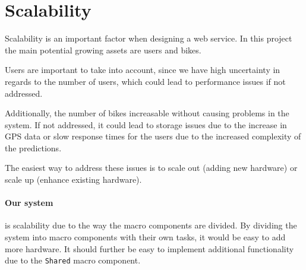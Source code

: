 \section{Scalability}
Scalability is an important factor when designing a web service. In this project the main  potential growing assets are users and bikes.

Users are important to take into account, since we have high uncertainty in regards to the number of users, which could lead to performance issues if not addressed.

Additionally, the number of bikes increasable without causing problems in the system. If not addressed, it could lead to storage issues due to the increase in GPS data or slow response times for the users due to the increased complexity of the predictions.

The easiest way to address these issues is to scale out (adding new hardware) or scale up (enhance existing hardware).

\paragraph{Our system} is scalability due to the way the macro components are divided. By dividing the system into macro components with their own tasks, it would be easy to add more hardware. It should further be easy to implement additional functionality due to the \texttt{Shared} macro component.